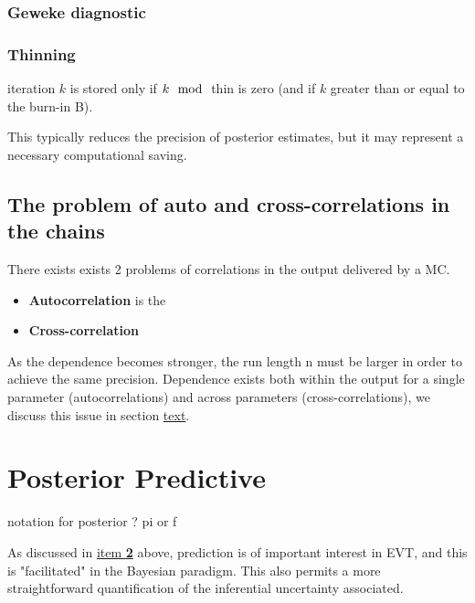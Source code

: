 \subsubsection*{Geweke diagnostic}



\subsubsection*{Thinning}

iteration $k$ is stored only if $k \mod$ thin is zero (and if $k$ greater than or equal to the burn-in B).

This typically reduces the precision of posterior estimates, but it may represent a necessary computational saving.


\subsection{The problem of auto and cross-correlations in the chains}


There exists exists 2 problems of correlations in the output delivered by a MC. 

\begin{itemize}
	\item \textbf{Autocorrelation} is the
	\item \textbf{Cross-correlation}
\end{itemize}

As the dependence becomes stronger, the run length n must be larger in order
to achieve the same precision. Dependence exists both within the output for a single parameter
(autocorrelations) and across parameters (cross-correlations), we discuss this issue in section \hyperref[label]{text}.

\section{Posterior Predictive}
notation for posterior ? pi or f


As discussed in \hyperref[it2bayes]{item \textbf{2}} above, prediction is of important interest in EVT, and this is "facilitated" in the Bayesian paradigm. This also permits a more straightforward quantification of the inferential uncertainty associated.

